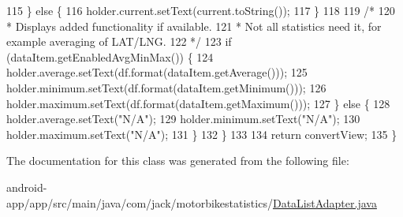 \begin{DoxyCode}
115             \} \textcolor{keywordflow}{else} \{
116                 holder.current.setText(current.toString());
117             \}
118 
119             \textcolor{comment}{/*}
120 \textcolor{comment}{             * Displays added functionality if available.}
121 \textcolor{comment}{             * Not all statistics need it, for example averaging of LAT/LNG.}
122 \textcolor{comment}{             */}
123             \textcolor{keywordflow}{if} (dataItem.getEnabledAvgMinMax()) \{
124                 holder.average.setText(df.format(dataItem.getAverage()));
125                 holder.minimum.setText(df.format(dataItem.getMinimum()));
126                 holder.maximum.setText(df.format(dataItem.getMaximum()));
127             \} \textcolor{keywordflow}{else} \{
128                 holder.average.setText(\textcolor{stringliteral}{"N/A"});
129                 holder.minimum.setText(\textcolor{stringliteral}{"N/A"});
130                 holder.maximum.setText(\textcolor{stringliteral}{"N/A"});
131             \}
132         \}
133 
134         \textcolor{keywordflow}{return} convertView;
135     \}
\end{DoxyCode}


The documentation for this class was generated from the following file\+:\begin{DoxyCompactItemize}
\item 
android-\/app/app/src/main/java/com/jack/motorbikestatistics/\hyperlink{_data_list_adapter_8java}{Data\+List\+Adapter.\+java}\end{DoxyCompactItemize}
